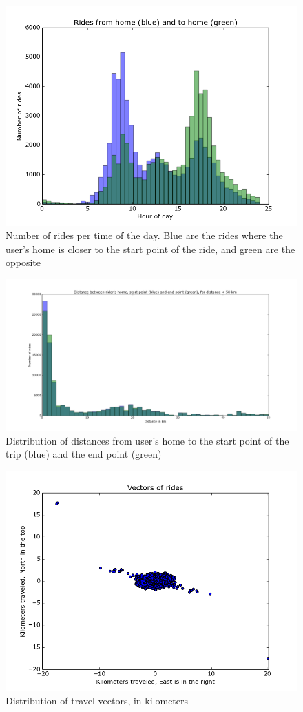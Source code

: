 \documentclass{article}
\begin{document}
\begin{figure}
	\centering
	\includegraphics[width=\textwidth]{../rides_from_home_to_home.png}
	\caption{Number of rides per time of the day. Blue are the rides where the user's home is closer to the start point of the ride, and green are the opposite}
	\label{fig:ridestofromhome}
\end{figure}

\begin{figure}
	\centering
	\includegraphics[width=\textwidth]{../start_end_home.png}
	\caption{Distribution of distances from user's home to the start point of the trip (blue) and the end point (green)}
	\label{fig:ridestofromhome}
\end{figure}

\begin{figure}
	\centering
	\includegraphics[width=\textwidth]{../travel_vector.png}
	\caption{Distribution of travel vectors, in kilometers}
	\label{fig:ridestofromhome}
\end{figure}
\end{document}

